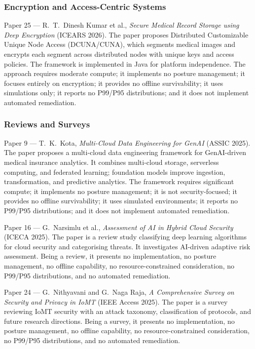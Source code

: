 \subsubsection{Encryption and Access-Centric Systems}

{Paper 25 --- R.~T.~Dinesh Kumar et al., \textit{Secure Medical Record Storage using Deep Encryption} (ICEARS 2026).} The paper proposes Distributed Customizable Unique Node Access (DCUNA/CUNA), which segments medical images and encrypts each segment across distributed nodes with unique keys and access policies. The framework is implemented in Java for platform independence. The approach requires moderate compute; it implements no posture management; it focuses entirely on encryption; it provides no offline survivability; it uses simulations only; it reports no P99/P95 distributions; and it does not implement automated remediation.

\subsubsection{Reviews and Surveys}

{Paper 9 --- T.~K.~Kota, \textit{Multi-Cloud Data Engineering for GenAI} (ASSIC 2025).} The paper proposes a multi-cloud data engineering framework for GenAI-driven medical insurance analytics. It combines multi-cloud storage, serverless computing, and federated learning; foundation models improve ingestion, transformation, and predictive analytics. The framework requires significant compute; it implements no posture management; it is not security-focused; it provides no offline survivability; it uses simulated environments; it reports no P99/P95 distributions; and it does not implement automated remediation.

{Paper 16 --- G.~Narsimlu et al., \textit{Assessment of AI in Hybrid Cloud Security} (ICECA 2025).} The paper is a review study classifying deep learning algorithms for cloud security and categorising threats. It investigates AI-driven adaptive risk assessment. Being a review, it presents no implementation, no posture management, no offline capability, no resource-constrained consideration, no P99/P95 distributions, and no automated remediation.

{Paper 24 --- G.~Nithyavani and G.~Naga Raja, \textit{A Comprehensive Survey on Security and Privacy in IoMT} (IEEE Access 2025).} The paper is a survey reviewing IoMT security with an attack taxonomy, classification of protocols, and future research directions. Being a survey, it presents no implementation, no posture management, no offline capability, no resource-constrained consideration, no P99/P95 distributions, and no automated remediation.

